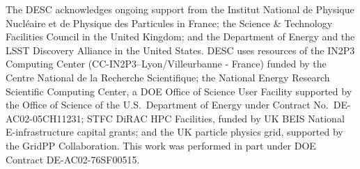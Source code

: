 The DESC acknowledges ongoing support from the Institut National de 
Physique Nucl\'eaire et de Physique des Particules in France; the 
Science \& Technology Facilities Council in the United Kingdom; and the
Department of Energy and the LSST Discovery Alliance
in the United States.  DESC uses resources of the IN2P3 
Computing Center (CC-IN2P3--Lyon/Villeurbanne - France) funded by the 
Centre National de la Recherche Scientifique; the National Energy 
Research Scientific Computing Center, a DOE Office of Science User 
Facility supported by the Office of Science of the U.S.\ Department of
Energy under Contract No.\ DE-AC02-05CH11231; STFC DiRAC HPC Facilities, 
funded by UK BEIS National E-infrastructure capital grants; and the UK 
particle physics grid, supported by the GridPP Collaboration.  This 
work was performed in part under DOE Contract DE-AC02-76SF00515.
